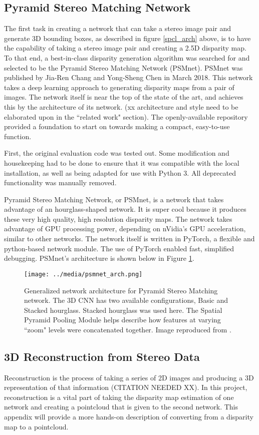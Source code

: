 \subsection{Pyramid Stereo Matching Network}
The first task in creating a network that can take a stereo image pair and generate 3D bounding boxes, as described in figure \ref{spcl_arch} above, is to have the capability of taking a stereo image pair and creating a 2.5D disparity map. To that end, a best-in-class disparity generation algorithm was searched for and selected to be the Pyramid Stereo Matching Network (PSMnet). PSMnet was published by Jia-Ren Chang and Yong-Sheng Chen in March 2018. This network takes a deep learning approach to generating disparity maps from a pair of images. The network itself is near the top of the state of the art, and achieves this by the architecture of its network. (xx architecture and style need to be elaborated upon in the ``related work" section). The openly-available repository provided a foundation to start on towards making a compact, easy-to-use function.

First, the original evaluation code was tested out. Some modification and housekeeping had to be done to ensure that it was compatible with the local installation, as well as being adapted for use with Python 3. All deprecated functionality was manually removed.

Pyramid Stereo Matching Network, or PSMnet, is a network that takes advantage of an hourglass-shaped network. It is super cool because it produces these very high quality, high resolution disparity maps. The network takes advantage of GPU processing power, depending on nVidia's GPU acceleration, similar to other networks. The network itself is written in PyTorch, a flexible and python-based network module. The use of PyTorch enabled fast, simplified debugging. PSMnet's architecture is shown below in Figure \ref{psmnet_arch}.


\begin{figure}[ht]
	\texttt{[image: ../media/psmnet\_arch.png]}
	\caption{Generalized network architecture for Pyramid Stereo Matching network. The 3D CNN has two available configurations, Basic and Stacked hourglass. Stacked hourglass was used here. The Spatial Pyramid Pooling Module helps describe how features at varying ``zoom" levels were concatenated together. Image reproduced from \cite{chang_pyramid_2018}.}
	\label{psmnet_arch}
\end{figure}

\subsection{3D Reconstruction from Stereo Data}
Reconstruction is the process of taking a series of 2D images and producing a 3D representation of that information (CITATION NEEDED XX). In this project, reconstruction is a vital part of taking the disparity map estimation of one network and creating a pointcloud that is given to the second network. This appendix will provide a more hands-on description of converting from a disparity map to a pointcloud.

